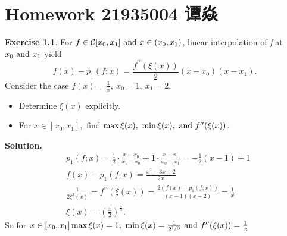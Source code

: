 \message{ !name(hw2-21935004-\unexpanded{谭焱}.tex)}\documentclass[a4paper]{book}
\makeatletter
\newenvironment{solution}%
{\noindent\textbf{Solution.}}%
{\qedhere}
\newcommand{\voidenvironment}[1]{%
  \expandafter\providecommand\csname env@#1@save@env\endcsname{}%
  \expandafter\providecommand\csname env@#1@process\endcsname{}%
  \@ifundefined{#1}{}{\RenewEnviron{#1}{}}%
}
\numberwithin{equation}{chapter}
\theoremstyle{definition}
\newtheorem{exc}[exm]{Exercise}
\makeatother
\begin{document}

\pagestyle{empty}
% 



\setcounter{chapter}{1}




\chapter{Homework 21935004 谭焱}



\begin{exc}
  For $ f \in \mathcal{C}[x_0, x_1] \textmd{ and } x \in (x_0, x_1)$, linear interpolation of \textit{f} at $x_0 \textmd{ and } x_1$ yield
  \begin{equation}
    \label{eq:2:1:1}
    f(x) - p_1(f;x) = \frac{f^{\prime \prime}(\xi(x))}{2}(x - x_0)(x - x_1).
  \end{equation}
  Consider the case $f(x) = \frac{1}{x},\ x_0 = 1, \ x_1 = 2. $
  \begin{itemize}
  \item Determine $\xi(x)$ explicitly.
  \item For $x \in [x_0, x_1], $ find $\max \xi(x),\ \min \xi(x), \textmd{ and } f^{\prime \prime}(\xi(x))$. 
  \end{itemize}
\end{exc}

\begin{solution}
  \begin{align*}
    &p_1(f;x) = \frac{1}{2} \cdot \frac{x - x_0}{ x_1 - x_0} + 1 \cdot \frac{x - x_1}{x_0 - x_1} = -\frac{1}{2}(x - 1) + 1 \\
    &f(x) - p_1(f;x) = \frac{x^2 - 3x + 2}{2x} \\
    &\frac{1}{2\xi^3(x)} = f^{\prime \prime}(\xi(x)) = \frac{2(f(x) - p_1(f;x))}{(x-1)(x-2)} = \frac{1}{x} \\
    &\xi(x) = (\frac{x}{2})^{\frac{1}{3}}.
  \end{align*}
  So for $x \in [x_0, x_1] \max\xi(x) = 1,\ \min \xi(x) = \frac{1}{2^{1/3}}\textmd{ and } f^{\prime \prime}(\xi(x)) = \frac{1}{x}$
\end{solution}
\end{document}
